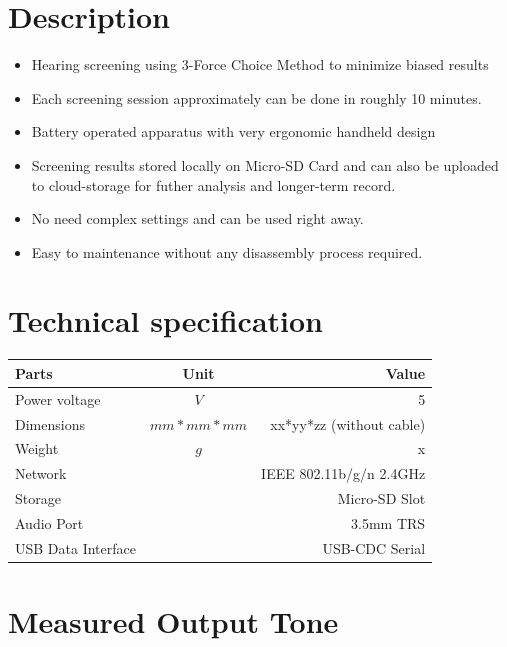 \documentclass[a4paper,12pt,oneside,pdflatex,italian,final,twocolumn]{article}
\begin{document}
\section{Description}
\begin{itemize}

\item Hearing screening using 3-Force Choice Method to minimize biased results

\item Each screening session approximately can be done in roughly 10 minutes.

\item Battery operated apparatus with very ergonomic handheld design

\item Screening results stored locally on Micro-SD Card and can also be uploaded to cloud-storage for futher analysis and longer-term record.

\item No need complex settings and can be used right away.


\item Easy to maintenance without any disassembly process required.

\end{itemize}

\section{Technical specification}
\centering
\begin{tabular}{lcr}
\toprule
Parts & Unit & Value \\
\midrule
Power voltage & $V$ & 5 \\
Dimensions & $mm*mm*mm$ & xx*yy*zz (without cable) \\
Weight & $g$ & x \\
Network & & IEEE 802.11b/g/n 2.4GHz \\
Storage & & Micro-SD Slot \\
Audio Port & & 3.5mm TRS \\
USB  Data Interface & & USB-CDC Serial \\
\bottomrule
\end{tabular}

\raggedright

\section{Measured Output Tone}
\end{document}
